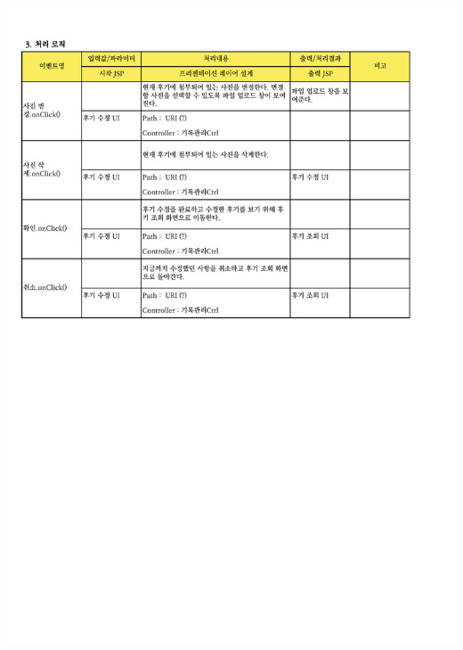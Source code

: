 {{{{{{{{{{{{{{{{{{{{{{{{{{{{{{{\includegraphics[width=20cm]{./Figure/Analysis/Display/review/review_06.pdf} \\
}}}}}}}}}}}}}}}}}}}}}}}}}}}}}}}
